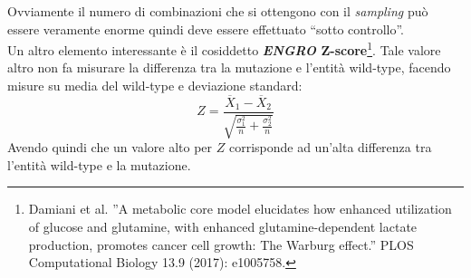 \documentclass[a4paper,12pt, oneside]{book}
\begin{document}
Ovviamente il numero di combinazioni che si ottengono con il \textit{sampling}
può essere veramente enorme quindi deve essere effettuato ``sotto controllo''.\\
Un altro elemento interessante è il cosiddetto \textbf{\textit{ENGRO}
  Z-score}\footnote{Damiani et al. ”A metabolic core model elucidates how
  enhanced utilization of glucose and glutamine, with enhanced
  glutamine-dependent lactate production, promotes cancer cell growth: The
  Warburg effect.” PLOS Computational Biology 13.9 (2017): e1005758.}. Tale
valore altro non fa misurare la differenza tra la mutazione e l'entità
wild-type, facendo misure su media del wild-type e deviazione standard:
\[Z=\frac{\overline{X}_1-\overline{X}_2}{\sqrt{\frac{\sigma_1^2}{n}+
      \frac{\sigma_2^2}{n}}}\]
Avendo quindi che un valore alto per $Z$ corrisponde ad un'alta differenza tra
l'entità wild-type e la mutazione.
\end{document}
